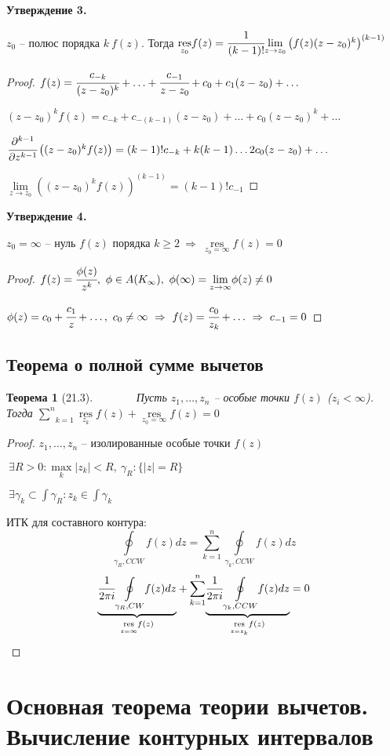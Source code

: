 \documentclass[draft]{report}
\newcommand{\res}{\mathop{\mathrm{res}}\nolimits}
\renewcommand{\bf}{\bfseries}
\newcommand{\forcenewline}{$\phantom{\mbox{newline}}$\newline}
\newcommand{\dd}{\partial}
\newcommand{\then}{\ \Rightarrow\ }
\newcommand{\moint}[1]{\underset{#1}{\oint}}
\newcommand{\msum}[2]{\underset{#1}{\overset{#2}{\sum}}}
\newcommand{\mlim}[1]{\underset{#1}{\lim}}
\newcommand{\mres}[1]{\underset{#1}{\res}}
\newcommand{\g}{\gamma}
\renewcommand{\f}{\phi}
\newcommand{\E}{\ \exists}
\newtheorem*{theor}{Теорема}
\theoremstyle{remark}
\begin{document}
{\bf Утверждение 3.}

$z_0$ -- полюс порядка $k\ f(z)$. Тогда $\mres{z_0}f(z)=\cfrac{1}{(k-1)!}\mlim{z\to z_0}\left(f(z)(z-z_0)^k\right)^{(k-1)}$

\begin{proof}
$f(z)=\cfrac{c_{-k}}{(z-z_0)^k}+\ldots+\cfrac{c_{-1}}{z-z_0}+c_0+c_1(z-z_0)+\ldots$

$(z-z_0)^kf(z)=c_{-k}+c_{-(k-1)}(z-z_0)+\ldots+c_0(z-z_0)^k+\ldots$

$\cfrac{\dd^{k-1}}{\dd z^{k-1}}\left((z-z_0)^kf(z)\right)=(k-1)!c_{-k}+k(k-1)\ldots2c_0(z-z_0)+\ldots$

$\mlim{z\to z_0}\left((z-z_0)^kf(z)\right)^{(k-1)}=(k-1)!c_{-1}$
\end{proof}

{\bf Утверждение 4.}

$z_0=\infty$ -- нуль $f(z)$ порядка $k\geq2\then\mres{z_0=\infty}f(z)=0$
\begin{proof}
$f(z)=\cfrac{\f(z)}{z^k},\ \f\in A(K_\infty),\ \f(\infty)=\mlim{z\to\infty}\f(z)\neq0$

$\f(z)=c_0+\cfrac{c_1}z+\ldots,\ c_0\neq\infty\then f(z)=\cfrac{c_0}{z_k}+\ldots\then c_{-1}=0$
\end{proof}

\subsection{Теорема о полной сумме вычетов}

\begin{theor}[21.3]
\forcenewline
Пусть $z_1,\ldots,z_n$ -- особые точки $f(z)$ ($z_i<\infty$). Тогда $\msum{k=1}{n}\mres{z_k}f(z)+\mres{z_0=\infty}f(z)=0$
\end{theor}

\begin{proof}
$z_1,\ldots,z_n$ -- изолированные особые точки $f(z)$

$\E R>0\colon\underset{k}{\max}|z_k|<R,\ \g_R\colon\{|z|=R\}$

$\E\g_k\subset\int\g_R\colon z_k\in\int\g_k$

ИТК для составного контура:
$$
\moint{\g_R,CCW}f(z)dz=\msum{k=1}{n}\moint{\g_k,CCW}f(z)dz
$$
$$
\underset{\mres{z=\infty}f(z)}{\underbrace{\cfrac{1}{2\pi i}\moint{\g_R,CW}f(z)dz}}+\msum{k=1}{n}\underset{\mres{z=z_k}f(z)}{\underbrace{\cfrac{1}{2\pi i}\moint{\g_k,CCW}f(z)dz}}=0
$$
\end{proof}

\section{Основная теорема теории вычетов. Вычисление контурных интервалов}
\end{document}
